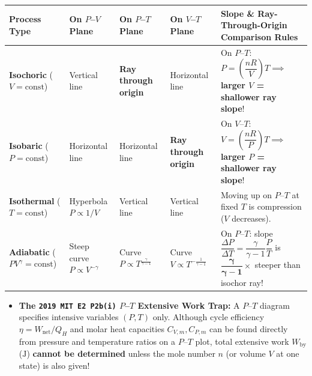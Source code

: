 \begin{formulacard}
\par\smallskip\noindent
\footnotesize\setlength{\tabcolsep}{3.5pt}\renewcommand{\arraystretch}{1.15}
\begin{tabularx}{\linewidth}{@{}l l l l X@{}}
\toprule
\textbf{Process Type} & \textbf{On $P$--$V$ Plane} & \textbf{On $P$--$T$ Plane} & \textbf{On $V$--$T$ Plane} & \textbf{Slope \& Ray-Through-Origin Comparison Rules} \\
\midrule
\textbf{Isochoric} ($V=\mathrm{const}$) & Vertical line & \textbf{Ray through origin} & Horizontal line & On $P$--$T$: $P = \left(\dfrac{nR}{V}\right)T \implies$ \textbf{larger $V$ = shallower ray slope}! \\
\textbf{Isobaric} ($P=\mathrm{const}$) & Horizontal line & Horizontal line & \textbf{Ray through origin} & On $V$--$T$: $V = \left(\dfrac{nR}{P}\right)T \implies$ \textbf{larger $P$ = shallower ray slope}! \\
\textbf{Isothermal} ($T=\mathrm{const}$) & Hyperbola $P \propto 1/V$ & Vertical line & Vertical line & Moving up on $P$--$T$ at fixed $T$ is compression ($V$ decreases). \\
\textbf{Adiabatic} ($PV^\gamma=\mathrm{const}$) & Steep curve $P \propto V^{-\gamma}$ & Curve $P \propto T^{\frac{\gamma}{\gamma-1}}$ & Curve $V \propto T^{-\frac{1}{\gamma-1}}$ & On $P$--$T$: slope $\dfrac{\Delta P}{\Delta T} = \dfrac{\gamma}{\gamma - 1}\dfrac{P}{T}$ is $\mathbf{\dfrac{\gamma}{\gamma - 1}\times}$ steeper than isochor ray! \\
\bottomrule
\end{tabularx}
\par\smallskip\noindent
{}
\begin{itemize}
  \item \textbf{The \texttt{2019 MIT E2 P2b(i)} $P$--$T$ Extensive Work Trap:} A $P$--$T$ diagram specifies intensive variables $(P, T)$ only. Although cycle efficiency $\eta = W_{\mathrm{net}}/Q_H$ and molar heat capacities $C_{V,m}, C_{P,m}$ can be found directly from pressure and temperature ratios on a $P$--$T$ plot, total extensive work $W_{\mathrm{by}}$ ($\si{\joule}$) \textbf{cannot be determined} unless the mole number $n$ (or volume $V$ at one state) is also given!

\end{itemize}
\end{formulacard}
